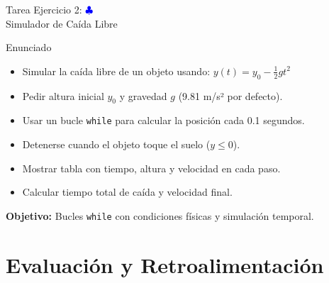 \documentclass[10pt]{beamer}
\begin{document}
\begin{frame}{Tarea Ejercicio 2: \hfill \textcolor{blue}{$\clubsuit$} \\ Simulador de Caída Libre}
  \begin{block}{Enunciado}
    \begin{itemize}
      \item Simular la caída libre de un objeto usando: \(y(t) = y_0 - \frac{1}{2}gt^2\)
      \item Pedir altura inicial \(y_0\) y gravedad \(g\) (9.81 m/s² por defecto).
      \item Usar un bucle \texttt{while} para calcular la posición cada 0.1 segundos.
      \item Detenerse cuando el objeto toque el suelo (\(y \leq 0\)).
      \item Mostrar tabla con tiempo, altura y velocidad en cada paso.
      \item Calcular tiempo total de caída y velocidad final.
    \end{itemize}
  \end{block}
  
  \textbf{Objetivo:} Bucles \texttt{while} con condiciones físicas y simulación temporal.
\end{frame}

\section{Evaluación y Retroalimentación}
\end{document}
